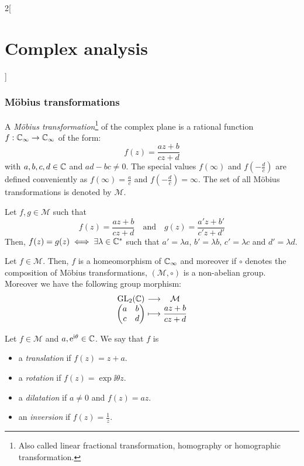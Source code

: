 \documentclass[../../../main_math.tex]{subfiles}
\begin{document}
\begin{multicols}{2}[\section{Complex analysis}]
  \subsubsection{Möbius transformations}
  \begin{definition}
    A \emph{Möbius transformation}\footnote{Also called linear fractional transformation, homography or homographic transformation.} of the complex plane is a rational function $f:\mathbb{C}_\infty\rightarrow\mathbb{C}_\infty$ of the form: $$f(z)=\frac{az+b}{cz+d}$$ with $a,b,c,d\in\mathbb{C}$ and $ad-bc\ne 0$. The special values $f(\infty)$ and $f\left(-\frac{d}{c}\right)$ are defined conveniently as $f(\infty)=\frac{a}{c}$ and $f\left(-\frac{d}{c}\right)=\infty$. The set of all Möbius transformations is denoted by $\mathcal{M}$.
  \end{definition}
  \begin{proposition}
    Let $f,g\in\mathcal{M}$ such that $$f(z)=\frac{az+b}{cz+d}\quad\text{and}\quad g(z)=\frac{a'z+b'}{c'z+d'}$$
    Then, $f(z)=g(z)\iff \exists\lambda\in\mathbb{C}^*$ such that $a'=\lambda a$, $b'=\lambda b$, $c'=\lambda c$ and $d'=\lambda d$.
  \end{proposition}
  \begin{proposition}
    Let $f\in\mathcal{M}$. Then, $f$ is a homeomorphism of $\mathbb{C}_\infty$ and moreover if $\circ$ denotes the composition of Möbius transformations, $(\mathcal{M},\circ)$ is a non-abelian group. Moreover we have the following group morphism:
    $$\function{}{\GL_2(\CC)}{\mathcal{M}}{\begin{pmatrix}
          a & b \\
          c & d
        \end{pmatrix}}{\displaystyle\frac{az+b}{cz+d}}$$
  \end{proposition}
  \begin{definition}
    Let $f\in\mathcal{M}$ and $a,\mathrm{e}^{\mathrm{i}\theta}\in\mathbb{C}$. We say that $f$ is
    \begin{itemize}
      \item a \emph{translation} if $f(z)=z+a$.
      \item a \emph{rotation} if $f(z)=\exp{\ii\theta}z$.
      \item a \emph{dilatation} if $a\ne 0$ and $f(z)=az$.
      \item an \emph{inversion} if $f(z)=\frac{1}{z}$.
    \end{itemize}
  \end{definition}
  \begin{theorem}

\end{theorem}
\end{multicols}
\end{document}
